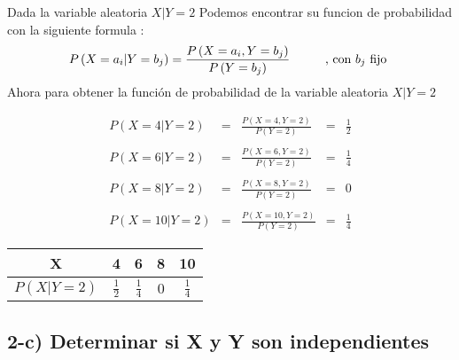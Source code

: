 \documentclass[12pt]{article}
\begin{document}
\begin{flushleft}
    Dada la variable aleatoria $ X | Y = 2 $ Podemos encontrar su funcion de probabilidad con la siguiente formula :
    \begin{equation*}
        P \left(X = a_i | Y = b_j\right) = \frac{P\left(X = a_i , Y = b_j\right)}{P \left(Y = b_j\right)}
        \hspace*{1cm}
        \mbox{, con $b_j$  fijo }
    \end{equation*}
    Ahora para obtener la funci\'on de probabilidad de la variable aleatoria $ X|Y =2$
\end{flushleft}

\begin{equation*}
    \begin{array}{rcccc}
        P\left(X = 4 | Y =2 \right)  & = & \displaystyle \frac{P\left(X=4 , Y=2\right)}{P\left(Y =2\right)}  & = & \displaystyle \frac{1}{2}
        \\
        \\
        P\left(X = 6 | Y =2 \right)  & = & \displaystyle \frac{P\left(X=6 , Y=2\right)}{P\left(Y =2\right)}  & = & \displaystyle \frac{1}{4}
        \\
        \\
        P\left(X = 8 | Y =2 \right)  & = & \displaystyle \frac{P\left(X=8 , Y=2\right)}{P\left(Y =2\right)}  & = & 0
        \\
        \\
        P\left(X = 10 | Y =2 \right) & = & \displaystyle \frac{P\left(X=10 , Y=2\right)}{P\left(Y =2\right)} & = & \displaystyle \frac{1}{4}
    \end{array}
\end{equation*}


\begin{center}
    \renewcommand{\arraystretch}{1.5}
    \begin{tabular}{|c|c|c|c|c|}
        \hline
        X                                    & 4              & 6              & 8   & 10
        \\
        \hline
        $\displaystyle P \left(X|Y=2\right)$ & $ \frac{1}{2}$ & $ \frac{1}{4}$ & $0$ & $ \frac{1}{4}$
        \\
        \hline
    \end{tabular}
\end{center}



\subsection*{2-c)  Determinar si X y Y  son independientes}
\end{document}
